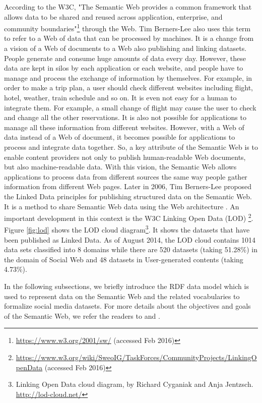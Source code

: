 According to the W3C, "The Semantic Web provides a common framework that allows data to be shared and reused across application, enterprise, and community boundaries"\footnote{\url{https://www.w3.org/2001/sw/} (accessed Feb 2016)} through the Web. Tim Berners-Lee \cite{berners2001semantic} also uses this term to refer to a Web of data that can be processed by machines. It is a change from a vision of a Web of documents to a Web also publishing and linking datasets. People generate and consume huge amounts of data every day. However, these data are kept in silos by each application or each website, and people have to manage and process the exchange of information by themselves. For example, in order to make a trip plan, a user should check different websites including flight, hotel, weather, train schedule and so on. It is even not easy for a human to integrate them. For example, a small change of flight may cause the user to check and change all the other reservations. It is also not possible for applications to manage all these information from different websites. However, with a Web of data instead of a Web of document, it becomes possible for applications to process and integrate data together. So, a key attribute of the Semantic Web is to enable content providers not only to publish human-readable Web documents, but also machine-readable data. With this vision, the Semantic Web allows applications to process data from different sources the same way people gather information from different Web pages. 
Later in 2006, Tim Berners-Lee \cite{berners2006linked} proposed the Linked Data principles for publishing structured data on the Semantic Web. It is a method to share Semantic Web data using the Web architecture \cite{bizer2011evolving}. An important development in this context is the W3C Linking Open Data (LOD) \footnote{\url{https://www.w3.org/wiki/SweoIG/TaskForces/CommunityProjects/LinkingOpenData} (accessed Feb 2016)}. Figure \ref{fig:lod} shows the LOD cloud diagram\footnote{Linking Open Data cloud diagram, by Richard Cyganiak and Anja Jentzsch. \url{http://lod-cloud.net/}}. It shows the datasets that have been published as Linked Data. As of August 2014, the LOD cloud contains 1014 data sets classified into 8 domains while there are 520 datasets (taking 51.28\%) in the domain of Social Web and 48 datasets in User-generated contents (taking 4.73\%).


In the following subsections, we briefly introduce the RDF data model which is used to represent data on the Semantic Web and the related vocabularies to formalize social media datasets. For more details about the objectives and goals of the Semantic Web, we refer the readers to \cite{feigenbaum2007semantic} and \cite{berners2001semantic}.

